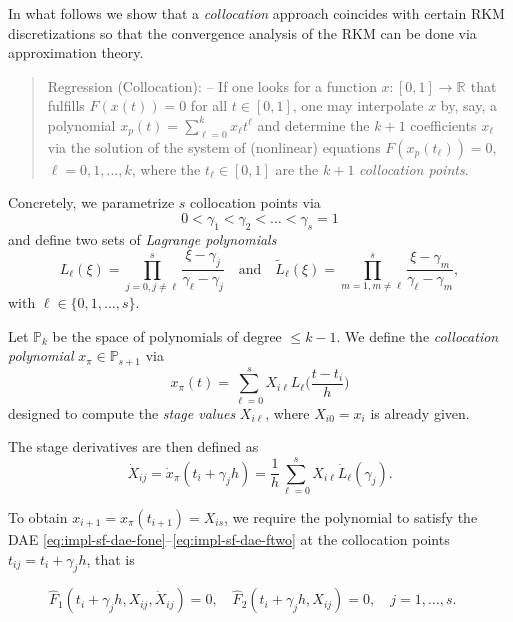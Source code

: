 \documentclass[]{book}
\theoremstyle{definition}
\theoremstyle{definition}
\theoremstyle{definition}
\theoremstyle{remark}
\begin{document}
In what follows we show that a \emph{collocation} approach coincides with certain RKM discretizations so that the convergence analysis of the RKM can be done via approximation theory.

\begin{quote}
Regression (Collocation): -- If one looks for a function \(x\colon [0,1] \to \mathbb R^{}\) that fulfills \(F(x(t))=0\) for all \(t\in[0,1]\), one may interpolate \(x\) by, say, a polynomial \(x_p(t) = \sum_{\ell=0}^kx_\ell t^\ell\) and determine the \(k+1\) coefficients \(x_\ell\) via the solution of the system of (nonlinear) equations \(F(x_p(t_\ell))=0\), \(\ell=0,1,\dotsc,k\), where the \(t_\ell\in[0,1]\) are the \(k+1\) \emph{collocation points}.
\end{quote}

Concretely, we parametrize \(s\) collocation points via
\begin{equation}
0< \gamma_1 <\gamma_2< \dotsc < \gamma_s=1 \label{eq:rkm-collo-gamma}
\end{equation}
and define two sets of \emph{Lagrange polynomials}
\[
L_\ell(\xi) = \prod_{j=0,j\neq \ell}^s \frac{\xi-\gamma_j}{\gamma_\ell-\gamma_j}
\quad\text{and}\quad
\tilde L_\ell(\xi) = \prod_{m=1,m\neq \ell}^s \frac{\xi-\gamma_m}{\gamma_\ell-\gamma_m},
\]
with \(\ell\in\{0,1,\dotsc,s\}\).

Let \(\mathbb P_k\) be the space of polynomials of degree \(\leq k-1\). We define the \emph{collocation polynomial} \(x_\pi \in \mathbb P_{s+1}\) via
\begin{equation}
x_\pi (t) = \sum_{\ell=0}^s X_{i\ell}L_\ell\bigl(\frac{t-t_i}{h}\bigr)
\label{eq:rkm-coll-collpol}
\end{equation}
designed to compute the \emph{stage values} \(X_{i\ell}\), where \(X_{i0}=x_i\) is already given.

The stage derivatives are then defined as
\begin{equation}
\dot X_{ij} = \dot x_\pi(t_i+\gamma_jh) = \frac 1h \sum_{\ell=0}^sX_{i\ell}\dot L_\ell(\gamma_j). \label{eq:rkm-coll-staged}
\end{equation}

To obtain \(x_{i+1}=x_\pi(t_{i+1})=X_{is}\), we require the polynomial to satisfy the DAE \eqref{eq:impl-sf-dae-fone}--\eqref{eq:impl-sf-dae-ftwo} at the collocation points \(t_{ij}=t_i+\gamma_jh\), that is

\begin{equation}
\hat F_1(t_i+\gamma_jh,X_{ij},\dot X_{ij}) = 0, \quad \hat F_2(t_i+\gamma_jh,X_{ij}) = 0, \quad j=1,\dotsc,s. \phantom{F_1} \label{eq:impl-sf-dae-collo}
\end{equation}
\end{document}
